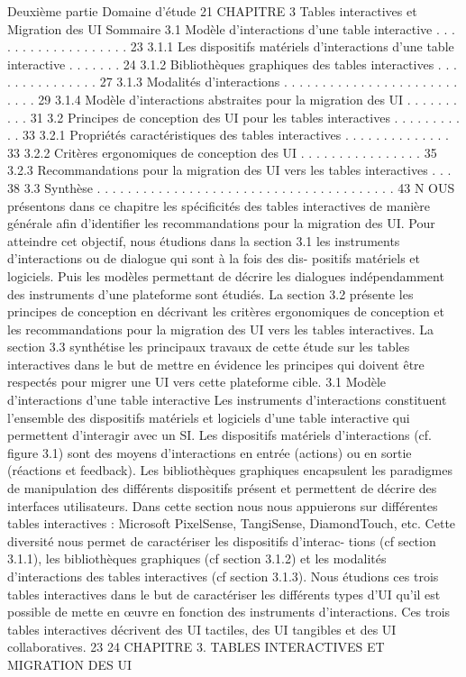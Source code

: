 \documentclass{article}
\begin{document}
Deuxième partie
Domaine d’étude
21
CHAPITRE 3
Tables interactives et Migration des UI
Sommaire
3.1
Modèle d’interactions d’une table interactive . . . . . . . . . . . . . . . . . . .
23
3.1.1
Les dispositifs matériels d’interactions d’une table interactive
. . . . . . .
24
3.1.2
Bibliothèques graphiques des tables interactives . . . . . . . . . . . . . . .
27
3.1.3
Modalités d’interactions . . . . . . . . . . . . . . . . . . . . . . . . . . .
29
3.1.4
Modèle d’interactions abstraites pour la migration des UI . . . . . . . . . .
31
3.2
Principes de conception des UI pour les tables interactives
. . . . . . . . . . .
33
3.2.1
Propriétés caractéristiques des tables interactives . . . . . . . . . . . . . .
33
3.2.2
Critères ergonomiques de conception des UI
. . . . . . . . . . . . . . . .
35
3.2.3
Recommandations pour la migration des UI vers les tables interactives . . .
38
3.3
Synthèse
. . . . . . . . . . . . . . . . . . . . . . . . . . . . . . . . . . . . . . .
43
N
OUS présentons dans ce chapitre les spéciﬁcités des tables interactives de manière générale aﬁn
d’identiﬁer les recommandations pour la migration des UI. Pour atteindre cet objectif, nous
étudions dans la section 3.1 les instruments d’interactions ou de dialogue qui sont à la fois des dis-
positifs matériels et logiciels. Puis les modèles permettant de décrire les dialogues indépendamment
des instruments d’une plateforme sont étudiés. La section 3.2 présente les principes de conception en
décrivant les critères ergonomiques de conception et les recommandations pour la migration des UI
vers les tables interactives. La section 3.3 synthétise les principaux travaux de cette étude sur les tables
interactives dans le but de mettre en évidence les principes qui doivent être respectés pour migrer une
UI vers cette plateforme cible.
3.1
Modèle d’interactions d’une table interactive
Les instruments d’interactions constituent l’ensemble des dispositifs matériels et logiciels d’une
table interactive qui permettent d’interagir avec un SI. Les dispositifs matériels d’interactions (cf.
ﬁgure 3.1) sont des moyens d’interactions en entrée (actions) ou en sortie (réactions et feedback).
Les bibliothèques graphiques encapsulent les paradigmes de manipulation des différents dispositifs
présent et permettent de décrire des interfaces utilisateurs.
Dans cette section nous nous appuierons sur différentes tables interactives : Microsoft PixelSense,
TangiSense, DiamondTouch, etc. Cette diversité nous permet de caractériser les dispositifs d’interac-
tions (cf section 3.1.1), les bibliothèques graphiques (cf section 3.1.2) et les modalités d’interactions
des tables interactives (cf section 3.1.3).
Nous étudions ces trois tables interactives dans le but de caractériser les différents types d’UI qu’il
est possible de mette en œuvre en fonction des instruments d’interactions. Ces trois tables interactives
décrivent des UI tactiles, des UI tangibles et des UI collaboratives.
23
24
CHAPITRE 3. TABLES INTERACTIVES ET MIGRATION DES UI
 
\end{document}
